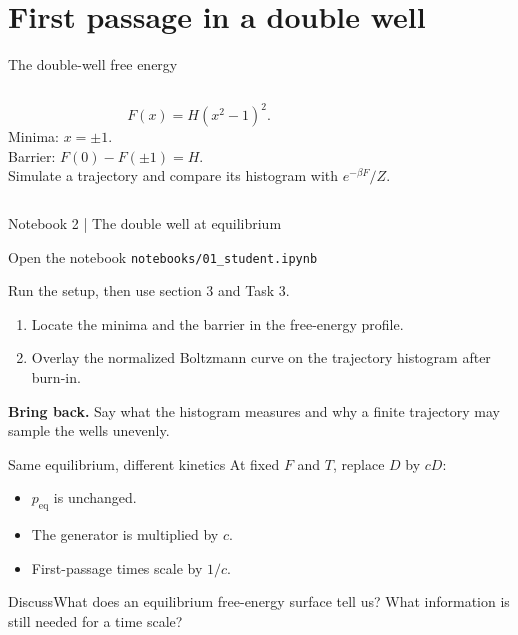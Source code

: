 \documentclass[aspectratio=169,10pt]{beamer}
\begin{document}
\section{First passage in a double well}
\begin{frame}{The double-well free energy}
\begin{columns}
\[F(x)=H(x^2-1)^2.\]
Minima: $x=\pm1$.\\
Barrier: $F(0)-F(\pm1)=H$.\\[0.3cm]
Simulate a trajectory and compare its histogram with $e^{-\beta F}/Z$.
\end{columns}
\end{frame}

\begin{frame}{Notebook 2 | The double well at equilibrium}
\begin{block}{Open the notebook}
\texttt{notebooks/01\_student.ipynb}\par
Run the setup, then use section 3 and Task 3.
\end{block}
\begin{enumerate}
\item Locate the minima and the barrier in the free-energy profile.
\item Overlay the normalized Boltzmann curve on the trajectory histogram after burn-in.
\end{enumerate}
\textbf{Bring back.} Say what the histogram measures and why a finite trajectory may sample the wells unevenly.
\end{frame}

\begin{frame}{Same equilibrium, different kinetics}
At fixed $F$ and $T$, replace $D$ by $cD$:
\begin{itemize}\item $p_{\mathrm{eq}}$ is unchanged.\item The generator is multiplied by $c$.\item First-passage times scale by $1/c$.\end{itemize}
\begin{block}{Discuss}What does an equilibrium free-energy surface tell us? What information is still needed for a time scale?\end{block}
\end{frame}
\end{document}
